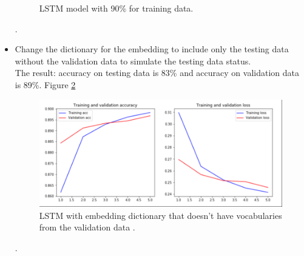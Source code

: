 \begin{itemize}
\begin{figure}[h!]
  \caption{LSTM model with 90\% for training data.}
  \label{fig:lstm90}
\end{figure} . 
\item Change the dictionary for the embedding to include only the testing data without the validation data to simulate the testing data status.
\\ The result:  accuracy on testing data is 83\% and accuracy on validation data is 89\%. Figure \ref{fig:lstmvoc}
\begin{figure}[h!]
  \includegraphics[width=\linewidth]{vocabChange.png}
  \caption{LSTM with embedding dictionary that doesn't have vocabularies from the validation data .}
  \label{fig:lstmvoc}
\end{figure} . 
\end{itemize}

